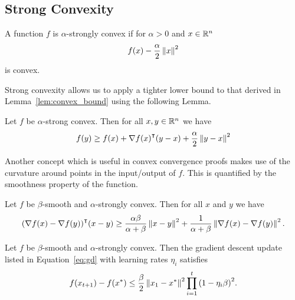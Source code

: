\subsection{Strong Convexity}

\begin{definition}
    A function $f$ is $\alpha$-strongly convex if for $\alpha > 0$ and $x \in
    \mathbb R^n$
    \begin{equation}
        f(x) - \frac{\alpha}{2}\left\| x \right\|^2   
    \end{equation}
    is convex.
\end{definition}

Strong convexity allows us to apply a tighter lower bound to that derived in
Lemma~\ref{lem:convex_bound} using the following Lemma.

\begin{lemma}
    Let $f$ be $\alpha$-strong convex. Then for all $x, y \in \mathbb R^n$ we have 
    \begin{equation}
        f(y) \geq f(x) + \nabla {f(x)}^\intercal(y - x) + \frac{\alpha}{2}
        \left\| y - x \right\|^2
    \end{equation}
\end{lemma}

Another concept which is useful in convex convergence proofs makes use of the
curvature around points in the input/output of $f$. This is quantified by the
smoothness property of the function.


\begin{lemma}
    Let $f$ be $\beta$-smooth and $\alpha$-strongly convex. Then for all $x$ and
    $y$ we have
    \begin{equation}
        {(\nabla f(x) - \nabla f(y))}^\intercal (x - y) \geq
        \frac{\alpha\beta}{\alpha + \beta} \left\| x - y \right\|^2 + \frac{1}{\alpha +
        \beta} \left\| \nabla f(x) - \nabla f(y) \right\|^2.
    \end{equation}
\end{lemma}

\begin{theorem}
    Let $f$ be $\beta$-smooth  and $\alpha$-strongly convex. Then the
    gradient descent update listed in Equation~\ref{eq:gd} with learning rates
    $\eta_i$ satisfies
    \begin{equation}
        f(x_{t+1}) - f(x^*) \leq \frac{\beta}{2} \left\| x_1 - x^* \right\|^2\prod_{i = 1}^t {\left( 1 - \eta_i \beta
        \right)}^{2} .
    \end{equation}
\end{theorem}

